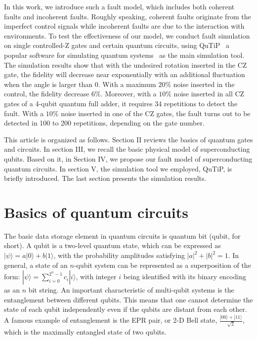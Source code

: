 \documentclass[conference, 9pt]{IEEEtran}
\begin{document}
In this work, we introduce such a fault model, which includes both coherent faults and incoherent faults. Roughly speaking, coherent faults originate from the imperfect control signals while incoherent faults are due to the interaction with environments. To test the effectiveness of our model, we conduct fault simulation on single controlled-Z gates and certain quantum circuits, using QuTiP \textemdash \ a popular
software for simulating quantum systems \textemdash \ as the main simulation tool. The simulation results show that with the undesired rotation inserted in the CZ gate, the fidelity will decrease near exponentially with an additional fluctuation when the angle is larger than 0. With a maximum $20\%$ noise inserted in the control, the fidelity decrease $6\%$. Moreover, with a $10\%$ noise inserted in all CZ gates of a 4-qubit quantum full adder, it requires $34$ repetitions to detect the fault. With a $10\%$ noise inserted in one of the CZ gates, the fault turns out to be detected in 100 to 200 repetitions, depending on the gate number. 

This article is organized as follows.  Section II reviews the basics of quantum gates and circuits. In section III, we recall the basic physical model of superconducting qubits. Based on it, in Section IV, we propose our fault model of superconducting quantum circuits. In section V, the simulation tool we employed, QuTiP, is briefly introduced. The last section presents the simulation results. 

\section{Basics of quantum circuits}

The basic data storage element in quantum circuits is quantum bit (qubit, for short). A qubit is a two-level quantum state, which can be expressed as $|\psi\rangle = a|0\rangle + b|1\rangle$, with the probability amplitudes satisfying $|a|^2+|b|^2 = 1$. In general, a state of an $n$-qubit system can be represented as a superposition of the form: $|\psi\rangle = \sum_{i=0}^{2^n-1} c_i |i\rangle$, with integer $i$ being identified with its  binary encoding as an $n$ bit string. An important characteristic of multi-qubit systems is the entanglement between different qubits. This means that one cannot determine the state of each qubit independently even if the qubits are distant from each other. A famous example  of entanglement is the EPR pair, or 2-D Bell state, $\frac{|00\rangle+|11\rangle}{\sqrt{2}}$, which is the maximally entangled state of two qubits. 
\end{document}
